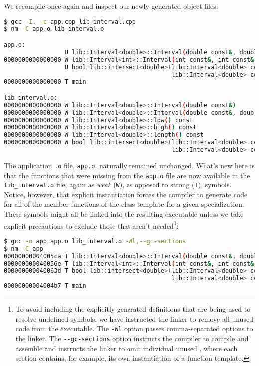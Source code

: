 \noindent We recompile once again and inspect our newly generated object files:

\begin{lstlisting}[language=bash]
$ gcc -I. -c app.cpp lib_interval.cpp
$ nm -C app.o lib_interval.o

app.o:
                 U lib::Interval<double>::Interval(double const&, double const&)
0000000000000000 W lib::Interval<int>::Interval(int const&, int const&)
                 U bool lib::intersect<double>(lib::Interval<double> const&,
                                               lib::Interval<double> const&)
0000000000000000 T main

lib_interval.o:
0000000000000000 W lib::Interval<double>::Interval(double const&)
0000000000000000 W lib::Interval<double>::Interval(double const&, double const&)
0000000000000000 W lib::Interval<double>::low() const
0000000000000000 W lib::Interval<double>::high() const
0000000000000000 W lib::Interval<double>::length() const
0000000000000000 W bool lib::intersect<double>(lib::Interval<double> const&,
                                               lib::Interval<double> const&)
\end{lstlisting}

\noindent The application \lstinline!.o! file, \lstinline!app.o!, naturally remained
unchanged. What's new here is that the functions that were missing from
the \lstinline!app.o! file are now available in the
\lstinline!lib_interval.o! file, again as \emph{weak} (\lstinline!W!), as
opposed to strong (\lstinline!T!), symbols. Notice, however, that explicit
instantiation forces the compiler to generate code for all of the member
functions of the class template for a given specialization. These
symbols might all be linked into the resulting executable unless we take
explicit precautions to exclude those that aren't
needed{\cprotect\footnote{To avoid including the explicitly generated
definitions that are being used to resolve undefined symbols, we have
instructed the linker to remove all unused code  from the
executable. The \lstinline!-Wl! option passes comma-separated options to
the linker. The \lstinline!--gc-sections! option instructs the compiler
to compile and assemble and instructs the linker to omit individual
unused , where each section contains, for example, its own
  instantiation of a function template.}}:

\begin{lstlisting}[language=bash]
$ gcc -o app app.o lib_interval.o -Wl,--gc-sections
$ nm -C app
00000000004005ca T lib::Interval<double>::Interval(double const&, double const&)
000000000040056e T lib::Interval<int>::Interval(int const&, int const&)
000000000040063d T bool lib::intersect<double>(lib::Interval<double> const&,
                                               lib::Interval<double> const&)
00000000004004b7 T main
\end{lstlisting}

